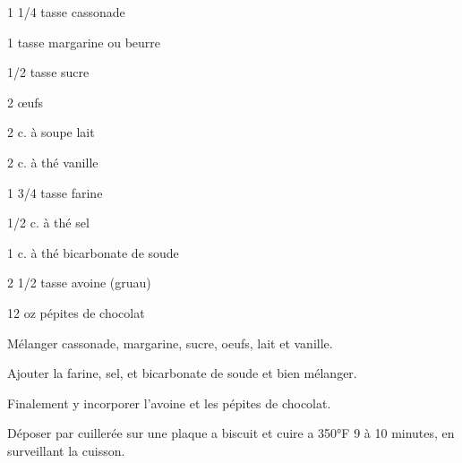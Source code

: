 


\totaltime{}


\begin{ingredients}
    \item 1 1/4 tasse cassonade
    \item 1 tasse margarine ou beurre
    \item 1/2 tasse sucre
    \item 2 œufs
    \item 2 c. à soupe lait
    \item 2 c. à thé vanille
    \item 1 3/4 tasse farine
    \item 1/2 c. à thé sel
    \item 1 c. à thé bicarbonate de soude
    \item 2 1/2 tasse avoine (gruau)
    \item 12 oz pépites de chocolat
\end{ingredients}

\begin{steps}
    \item Mélanger cassonade, margarine, sucre, oeufs, lait et vanille.
    \item Ajouter la farine, sel, et bicarbonate de soude et bien mélanger.
    \item Finalement y incorporer l'avoine et les pépites de chocolat.
    \item Déposer par cuillerée sur une plaque a biscuit et cuire a 350°F 9 à 10 minutes, en surveillant la cuisson.
\end{steps}
